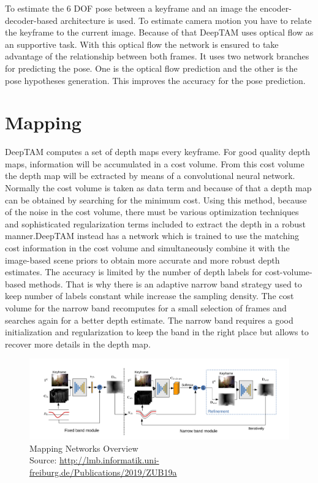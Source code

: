 To estimate the 6 DOF pose between a keyframe and an image the encoder-decoder-based architecture is used. To estimate camera motion you have to relate the keyframe to the current image. Because of that DeepTAM uses optical flow as an supportive task. With this optical flow the network is ensured to take advantage of the relationship between both frames. It uses two network branches for predicting the pose. One is the optical flow prediction and the other is the pose hypotheses generation. This improves the accuracy for the pose prediction.

\section{Mapping}

DeepTAM computes a set of depth maps every keyframe. For good quality depth maps, information will be accumulated in a cost volume. From this cost volume the depth map will be extracted by means of a convolutional neural network.
\newline
\newline
Normally the cost volume is taken as data term and because of that a depth map can be obtained by searching for the minimum cost. Using this method, because of the noise in the cost volume, there must be various optimization techniques and sophisticated regularization terms included to extract the depth in a robust manner.DeepTAM instead has a network which is trained to use the matching cost information in the cost volume and simultaneously combine it with the image-based scene priors to obtain more accurate and more robust depth estimates. 
\newline
\newline
The accuracy is limited by the number of depth labels for cost-volume-based methods. That is why there is an adaptive narrow band strategy used to keep number of labels constant while increase the sampling density. The cost volume for the narrow band recomputes for a small selection of frames and searches again for a better depth estimate. The narrow band requires a good initialization and regularization to keep the band in the right place but allows to recover more details in the depth map.

\begin{figure}[h]
	\centering
	\includegraphics[width=1.1\textwidth]{./media/images/DeepTAM-Mapping.PNG}
  	\caption{Mapping Networks Overview
  	\\Source: \url{http://lmb.informatik.uni-freiburg.de/Publications/2019/ZUB19a}}
  	\label{DeepTAM-Mapping}
\end{figure}


